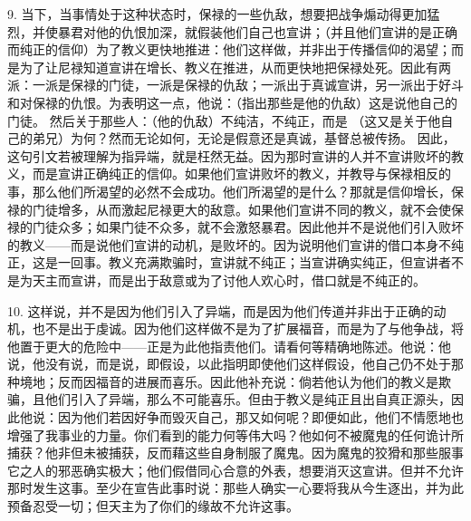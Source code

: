 9. 当下，当事情处于这种状态时，保禄的一些仇敌，想要把战争煽动得更加猛烈，并使暴君对他的仇恨加深，就假装他们自己也宣讲；（并且他们宣讲的是正确而纯正的信仰）为了教义更快地推进：他们这样做，并非出于传播信仰的渴望；而是为了让尼禄知道宣讲在增长、教义在推进，从而更快地把保禄处死。因此有两派：一派是保禄的门徒，一派是保禄的仇敌；一派出于真诚宣讲，另一派出于好斗和对保禄的仇恨。为表明这一点，他说：（指出那些是他的仇敌）这是说他自己的门徒。 然后关于那些人：（他的仇敌）不纯洁，不纯正，而是 （这又是关于他自己的弟兄）为何？然而无论如何，无论是假意还是真诚，基督总被传扬。 因此，这句引文若被理解为指异端，就是枉然无益。因为那时宣讲的人并不宣讲败坏的教义，而是宣讲正确纯正的信仰。如果他们宣讲败坏的教义，并教导与保禄相反的事，那么他们所渴望的必然不会成功。他们所渴望的是什么？那就是信仰增长，保禄的门徒增多，从而激起尼禄更大的敌意。如果他们宣讲不同的教义，就不会使保禄的门徒众多；如果门徒不众多，就不会激怒暴君。因此他并不是说他们引入败坏的教义——而是说他们宣讲的动机，是败坏的。因为说明他们宣讲的借口本身不纯正，这是一回事。教义充满欺骗时，宣讲就不纯正；当宣讲确实纯正，但宣讲者不是为天主而宣讲，而是出于敌意或为了讨他人欢心时，借口就是不纯正的。\par

10. 这样说，并不是因为他们引入了异端，而是因为他们传道并非出于正确的动机，也不是出于虔诚。因为他们这样做不是为了扩展福音，而是为了与他争战，将他置于更大的危险中——正是为此他指责他们。请看何等精确地陈述。他说：他说，他没有说，而是说，即假设，以此指明即使他们这样假设，他自己仍不处于那种境地；反而因福音的进展而喜乐。因此他补充说：倘若他认为他们的教义是欺骗，且他们引入了异端，那么不可能喜乐。但由于教义是纯正且出自真正源头，因此他说：因为他们若因好争而毁灭自己，那又如何呢？即便如此，他们不情愿地也增强了我事业的力量。你们看到的能力何等伟大吗？他如何不被魔鬼的任何诡计所捕获？他非但未被捕获，反而藉这些自身制服了魔鬼。因为魔鬼的狡猾和那些服事它之人的邪恶确实极大；他们假借同心合意的外表，想要消灭这宣讲。但并不允许那时发生这事。至少在宣告此事时说：那些人确实一心要将我从今生逐出，并为此预备忍受一切；但天主为了你们的缘故不允许这事。\par

